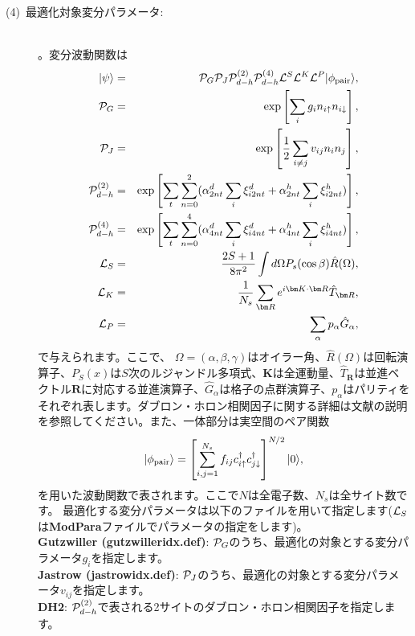 \begin{description}
\item[(4)~最適化対象変分パラメータ:] 
~\\ 。変分波動関数は
\begin{eqnarray}
|\psi \rangle &=& {\cal P}_G{\cal P}_J{\cal P}_{d-h}^{(2)}{\cal P}_{d-h}^{(4)}{\cal L}^S{\cal L}^K{\cal L}^P |\phi_{\rm pair} \rangle,\\
{\cal P}_G&=&\exp\left[ \sum_i g_i n_{i\uparrow} n_{i\downarrow} \right],\\
{\cal P}_J&=&\exp\left[\frac{1}{2} \sum_{i\neq j} v_{ij} n_i n_j\right],\\
{\cal P}_{d-h}^{(2)}&=& \exp \left[ \sum_t \sum_{n=0}^2 (\alpha_{2nt}^d \sum_{i}\xi_{i2nt}^d+\alpha_{2nt}^h \sum_{i}\xi_{i2nt}^h)\right],\\
{\cal P}_{d-h}^{(4)}&=& \exp \left[ \sum_t \sum_{n=0}^4 (\alpha_{4nt}^d \sum_{i}\xi_{i4nt}^d+\alpha_{4nt}^h \sum_{i}\xi_{i4nt}^h)\right],\\
{\cal L}_S&=&\frac{2S+1}{8 \pi^2}\int d\Omega P_s(\cos \beta) \hat{R}(\Omega),\\
{\cal L}_K&=&\frac{1}{N_s}\sum_{{\bm R}}e^{i {\bm K} \cdot{\bm R} } \hat{T}_{\bm R},\\
{\cal L}_P&=&\sum_{\alpha}p_{\alpha} \hat{G}_{\alpha},
\end{eqnarray}
で与えられます。ここで、 $\Omega=(\alpha, \beta, \gamma)$はオイラー角、$\hat{R}(\Omega)$は回転演算子、$P_S(x)$は$S$次のルジャンドル多項式、${\bm K}$は全運動量、$\hat{T}_{\bm R}$は並進ベクトル${\bm R}$に対応する並進演算子、$\hat{G}_{\alpha}$は格子の点群演算子、$p_\alpha$はパリティをそれぞれ表します。ダブロン・ホロン相関因子に関する詳細は文献\cite{Tahara2008}の説明を参照してください。また、一体部分は実空間のペア関数
\begin{equation}
|\phi_{\rm pair} \rangle = \left[\sum_{i, j=1}^{N_s} f_{ij}c_{i\uparrow}^{\dag}c_{j\downarrow}^{\dag} \right]^{N/2}|0 \rangle,
\end{equation}
を用いた波動関数で表されます。ここで$N$は全電子数、$N_s$は全サイト数です。
最適化する変分パラメータは以下のファイルを用いて指定します(${\cal L}_S$は{\bf ModPara}ファイルでパラメータの指定をします)。
~\\{\bf Gutzwiller (gutzwilleridx.def)}: ${\cal P}_G$のうち、最適化の対象とする変分パラメータ$g_i$を指定します。
~\\{\bf Jastrow (jastrowidx.def)}: ${\cal P}_J$のうち、最適化の対象とする変分パラメータ$v_{ij}$を指定します。
~\\{\bf DH2}:  ${\cal P}_{d-h}^{(2)}$で表される2サイトのダブロン・ホロン相関因子を指定します。

\end{description}
